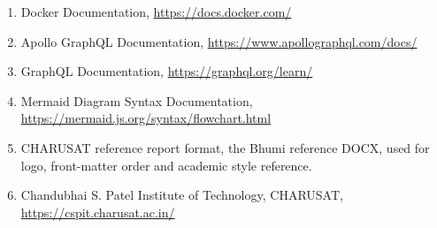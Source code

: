 \documentclass[12pt,a4paper]{report}
\begin{document}
\begin{enumerate}
\item Docker Documentation, \url{https://docs.docker.com/}
\item Apollo GraphQL Documentation, \url{https://www.apollographql.com/docs/}
\item GraphQL Documentation, \url{https://graphql.org/learn/}
\item Mermaid Diagram Syntax Documentation, \url{https://mermaid.js.org/syntax/flowchart.html}
\item CHARUSAT reference report format, the Bhumi reference DOCX, used for logo, front-matter order and academic style reference.
\item Chandubhai S. Patel Institute of Technology, CHARUSAT, \url{https://cspit.charusat.ac.in/}
\end{enumerate}
\normalsize
\end{document}
